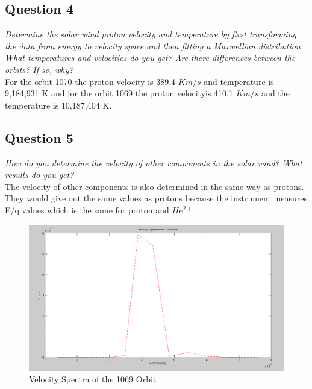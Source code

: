 \documentclass{article}
\begin{document}
\subsection{Question 4}
\textit{Determine the solar wind proton velocity and temperature by first transforming the
data from energy to velocity space and then fitting a Maxwellian distribution. What
temperatures and velocities do you get? Are there differences between the orbits? If
so, why?}\\

For the orbit 1070 the proton velocity is 389.4 $Km/s$ and temperature is {\color{red}9,184,931 K} 
and for the orbit 1069 the proton velocityis 410.1 $Km/s$ and the temperature is {\color{red}10,187,404 K.}

\subsection{Question 5}
\textit{How do you determine the velocity of other components in the solar wind? What
results do you get?}\\

The velocity of other components is also determined in the same way as protons. They would give out the same values as protons because the instrument measures E/q values which is the same for proton and $He^{2+}.$ 

\begin{figure}[!htb]
\centering
\includegraphics[scale=0.35]{Figures/velocity_spectra_1069.png}
\caption{Velocity Spectra of the 1069 Orbit}
\label{fig:Velocity_spectra_1069}
\end{figure}
\end{document}
